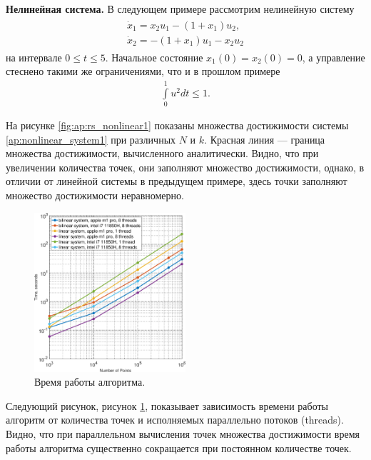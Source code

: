 \documentclass[../main.tex]{subfiles}
\begin{document}
   \textbf{Нелинейная система.} В следующем примере рассмотрим нелинейную систему 
   \begin{gather}\label{ap:nonlinear_system1}
   	\begin{gathered}
   	\dot{x}_1 = x_2 u_1 - (1 + x_1) u_2,\\
   	\dot{x}_2 = -(1 + x_1) u_1 - x_2 u_2
   	\end{gathered}
   \end{gather}
   на интервале  $ 0 \leqslant t \leqslant 5$.
    Начальное состояние $x_1(0) = x_2(0) = 0 $, а управление стеснено такими же ограничениями, что и в прошлом примере
   \begin{gather*}
   	\int\limits_0^1 u^2dt \leqslant 1.
   \end{gather*}
   
     На рисунке \ref{fig:ap:rs_nonlinear1} показаны множества достижимости системы \eqref{ap:nonlinear_system1} при различных $N$ и $k$.
       Красная линия --- граница множества достижимости, вычисленного аналитически.
   Видно, что при увеличении количества точек, они заполняют множество достижимости, однако, в отличии от линейной системы в предыдущем примере, здесь точки заполняют множество достижимости неравномерно.
   
     \begin{figure}[ht]
   	\centering
   	\includegraphics[width=0.5\textwidth]{images/time_complexity.eps}
   	\caption{Время работы алгоритма.}
   	\label{fig:ap:timings}
   \end{figure}
   
  Следующий рисунок, рисунок \ref{fig:ap:timings}, показывает зависимость времени работы алгоритм от количества точек и исполняемых параллельно потоков (threads). 
  Видно, что при параллельном вычисления точек множества достижимости время работы алгоритма существенно сокращается при постоянном количестве точек. 
  
\end{document}
